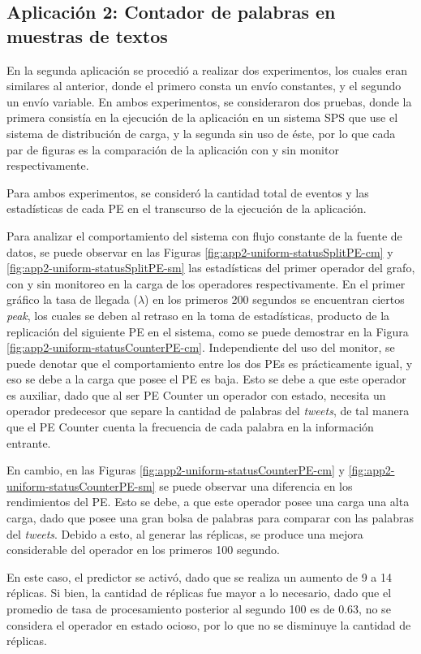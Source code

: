 \subsection{Aplicación 2: Contador de palabras en muestras de textos}
En la segunda aplicación se procedió a realizar dos experimentos, los cuales eran similares al anterior, donde el primero consta un envío constantes, y el segundo un envío variable. En ambos experimentos, se consideraron dos pruebas, donde la primera consistía en la ejecución de la aplicación en un sistema SPS que use el sistema de distribución de carga, y la segunda sin uso de éste, por lo que cada par de figuras es la comparación de la aplicación con y sin monitor respectivamente.

Para ambos experimentos, se consideró la cantidad total de eventos y las estadísticas de cada PE en el transcurso de la ejecución de la aplicación.

Para analizar el comportamiento del sistema con flujo constante de la fuente de datos, se puede observar en las Figuras \ref{fig:app2-uniform-statusSplitPE-cm} y \ref{fig:app2-uniform-statusSplitPE-sm} las estadísticas del primer operador del grafo, con y sin monitoreo en la carga de los operadores respectivamente. En el primer gráfico la tasa de llegada ($\lambda$) en los primeros 200 segundos se encuentran ciertos \textit{peak}, los cuales se deben al retraso en la toma de estadísticas, producto de la replicación del siguiente PE en el sistema, como se puede demostrar en la Figura \ref{fig:app2-uniform-statusCounterPE-cm}. Independiente del uso del monitor, se puede denotar que el comportamiento entre los dos PEs es prácticamente igual, y eso se debe a la carga que posee el PE es baja. Esto se debe a que este operador es auxiliar, dado que al ser PE Counter un operador con estado, necesita un operador predecesor que separe la cantidad de palabras del \textit{tweets}, de tal manera que el PE Counter cuenta la frecuencia de cada palabra en la información entrante.

En cambio, en las Figuras \ref{fig:app2-uniform-statusCounterPE-cm} y \ref{fig:app2-uniform-statusCounterPE-sm} se puede observar una diferencia en los rendimientos del PE. Esto se debe, a que este operador posee una carga una alta carga, dado que posee una gran bolsa de palabras para comparar con las palabras del \textit{tweets}. Debido a esto, al generar las réplicas, se produce una mejora considerable del operador en los primeros 100 segundo.

En este caso, el predictor se activó, dado que se realiza un aumento de 9 a 14 réplicas. Si bien, la cantidad de réplicas fue mayor a lo necesario, dado que el promedio de tasa de procesamiento posterior al segundo 100 es de 0.63, no se considera el operador en estado ocioso, por lo que no se disminuye la cantidad de réplicas.

